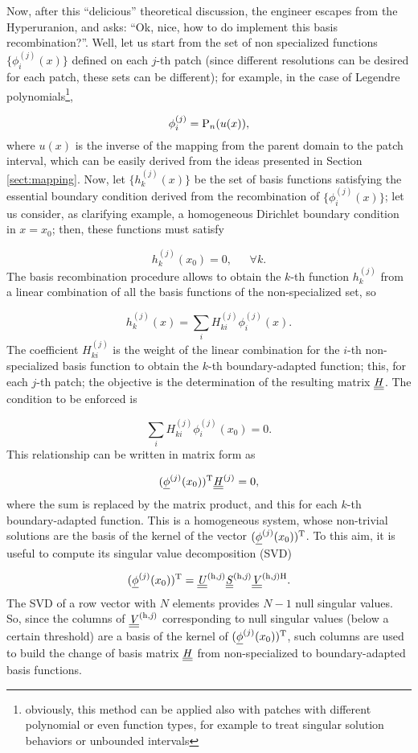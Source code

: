 \documentclass[a4paper,12pt]{article}
\begin{document}
Now, after this ``delicious'' theoretical discussion, the engineer escapes from the Hyperuranion, and asks: ``Ok, nice, how to do implement this basis recombination?''. Well, let us start from the set of non specialized functions $\{\phi_i^{(j)}(x)\}$ defined on each $j$-th patch (since different resolutions can be desired for each patch, these sets can be different); for example, in the case of Legendre polynomials\footnote{obviously, this method can be applied also with patches with different polynomial or even function types, for example to treat singular solution behaviors or unbounded intervals},

\[
\phi_i^{(j)} = \mathrm{P}_n(u(x)),
\]
where $u(x)$ is the inverse of the mapping from the parent domain to the patch interval, which can be easily derived from the ideas presented in Section \ref{sect:mapping}. Now, let $\{h_k^{(j)}(x)\}$ be the set of basis functions satisfying the essential boundary condition derived from the recombination of $\{\phi_i^{(j)}(x)\}$; let us consider, as clarifying example, a homogeneous Dirichlet boundary condition in $x = x_0$; then, these functions must satisfy

\[
h_k^{(j)}(x_0) = 0, ~~~~~~~ \forall k.
\]
The basis recombination procedure allows to obtain the $k$-th function $h_k^{(j)}$ from a linear combination of all the basis functions of the non-specialized set, so

\[
h_k^{(j)}(x) = \sum_i H_{ki}^{(j)} \phi_i^{(j)}(x).
\]
The coefficient $H_{ki}^{(j)}$ is the weight of the linear combination for the $i$-th non-specialized basis function to obtain the $k$-th boundary-adapted function; this, for each $j$-th patch; the objective is the determination of the resulting matrix $\underline{\underline{\mathit{H}}}$. The condition to be enforced is

\[
\sum_i H_{ki}^{(j)} \phi_i^{(j)}(x_0) = 0.
\]
This relationship can be written in matrix form as

\[
(\underline{\phi}^{(j)}(x_0))^{\mathrm{T}} \underline{\underline{\mathit{H}}}^{(j)}  = 0,
\]
where the sum is replaced by the matrix product, and this for each $k$-th boundary-adapted function. This is a homogeneous system, whose non-trivial solutions are the basis of the kernel of the vector $(\underline{\phi}^{(j)}(x_0))^{\mathrm{T}}$. To this aim, it is useful to compute its singular value decomposition (SVD)

\[
(\underline{\phi}^{(j)}(x_0))^{\mathrm{T}} = \underline{\underline{\mathit{U}}}^{\mathrm{(h,\mathit{j})}} \underline{\underline{\mathit{S}}}^{\mathrm{(h,\mathit{j})}} \underline{\underline{\mathit{V}}}^{\mathrm{(h,\mathit{j})H}}.
\]
The SVD of a row vector with $N$ elements provides $N-1$ null singular values. So, since the columns of $\underline{\underline{\mathit{V}}}^{\mathrm{(h,\mathit{j})}}$ corresponding to null singular values (below a certain threshold) are a basis of the kernel of $(\underline{\phi}^{(j)}(x_0))^{\mathrm{T}}$, such columns are used to build the change of basis matrix $\underline{\underline{\mathit{H}}}$ from non-specialized to boundary-adapted basis functions.
\end{document}
